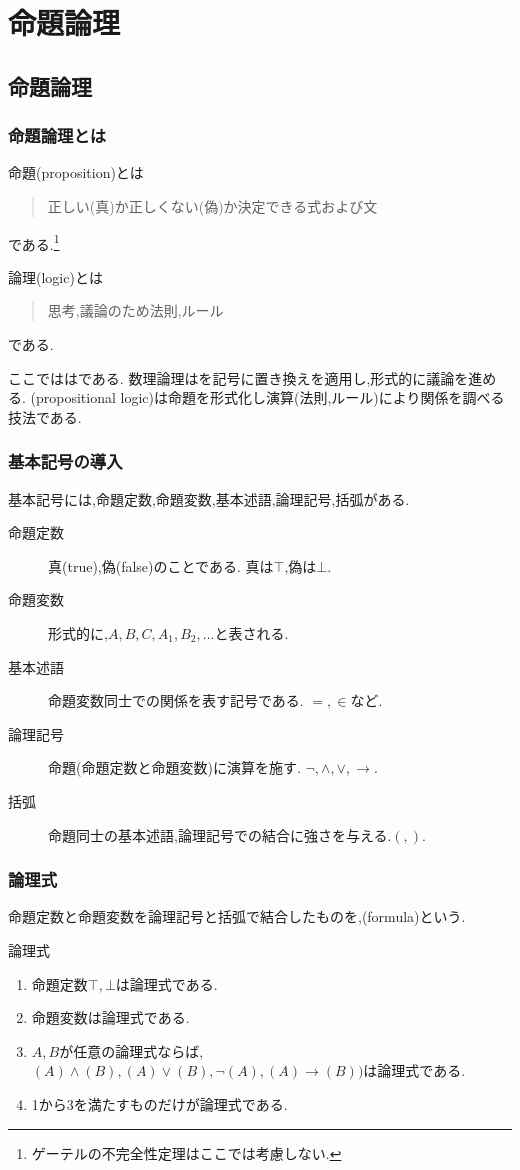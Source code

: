 \chapter{命題論理}
\section{命題論理}
\subsection{命題論理とは}
命題(proposition)とは
\begin{quotation}
 正しい(真)か正しくない(偽)か決定できる式および文
\end{quotation}
である.\footnote{ゲーテルの不完全性定理はここでは考慮しない.}

論理(logic)とは
\begin{quotation}
 思考,議論のため法則,ルール
\end{quotation}
である.

ここでははである.
数理論理はを記号に置き換えを適用し,形式的に議論を進める.
(propositional logic)は命題を形式化し演算(法則,ルール)により関係を調べる技法である.

\subsection{基本記号の導入}
基本記号には,命題定数,命題変数,基本述語,論理記号,括弧がある.
\begin{description}
 \item[命題定数] 真(true),偽(false)のことである. 真は$\top$,偽は$\bot$.
 \item[命題変数] 形式的に,$A,B,C,A_1,B_2,...$と表される.
 \item[基本述語] 命題変数同士での関係を表す記号である. $=,\in$など.
 \item[論理記号] 命題(命題定数と命題変数)に演算を施す. $\lnot,\land,\lor,\to$.
 \item[括弧] 命題同士の基本述語,論理記号での結合に強さを与える.$(,)$.
\end{description}
\newpage

\subsection{論理式}
命題定数と命題変数を論理記号と括弧で結合したものを,(formula)という.
\begin{dfn}
 論理式
 \begin{enumerate}
  \item 命題定数$\top,\bot$は論理式である.
  \item 命題変数は論理式である.
  \item $A,B$が任意の論理式ならば,$(A) \land (B),(A) \lor (B), \lnot (A), (A) \to (B))$は論理式である.
  \item 1から3を満たすものだけが論理式である.
 \end{enumerate}
\end{dfn}

